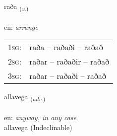 \documentclass[frontgrid, backgrid]{flacards}\usepackage[]{graphicx}\usepackage[]{color}
\begin{document}
\renewcommand{\flhead}{\vskip5pt \fboxsep=0pt {\small\bfseries\footnotesize Sagnorð | Verb}}
\renewcommand{\fcfoot}{\vskip5pt \fboxsep=0pt \hspace{2pt}{\small\bfseries\footnotesize 2K}}

\renewcommand{\blhead}{\vskip5pt {\small\bfseries\footnotesize Sagnorð | Verb }}
\renewcommand{\bcfoot}{\vskip5pt \hspace{2pt}{\small\bfseries\footnotesize 2K}}


{raða \small{\textsubscript{(\textit{v.})}} \\[1ex] %
\textphonetic{[raːða]} \\
en: \emph{arrange} \\  [2ex]
\renewcommand*{\arraystretch}{0.8}
\begin{tabular}{p{1cm}l}
\textsc{1sg}: & raða -- raðaði -- raðað \\ 
\textsc{2sg}: & raðar -- raðaðir -- raðað \\ 
\textsc{3sg}: & raðar -- raðaði -- raðað \\ 
\end{tabular}
}


\renewcommand{\flhead}{\vskip5pt \fboxsep=0pt {\small\bfseries\footnotesize Atviksorð | Adverb}}
\renewcommand{\fcfoot}{\vskip5pt \fboxsep=0pt \hspace{2pt}{\small\bfseries\footnotesize 2K}}

\renewcommand{\blhead}{\vskip5pt {\small\bfseries\footnotesize Atviksorð | Adverb }}
\renewcommand{\bcfoot}{\vskip5pt \hspace{2pt}{\small\bfseries\footnotesize 2K}}


{allavega \small{\textsubscript{(\textit{adv.})}} \\[1ex]
\textphonetic{[atlavɛɣa]} \\
en: \emph{anyway, in any case} \\  [2ex]
allavega (Indeclinable)}

\renewcommand{\flhead}{\vskip5pt \fboxsep=0pt {\small\bfseries\footnotesize Nafnorð | Noun}}
\renewcommand{\fcfoot}{\vskip5pt \fboxsep=0pt \hspace{2pt}{\small\bfseries\footnotesize 2K}}
\end{document}

